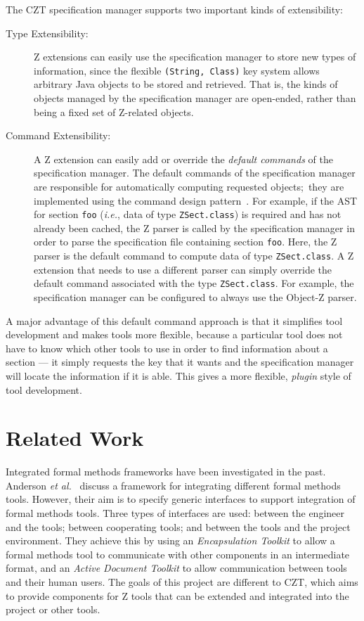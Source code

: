 \documentclass{llncs}
\newcommand{\Interface}[1]{\texttt{#1}}
\begin{document}
  The CZT specification manager supports two important kinds of
  extensibility:
  \begin{description}
  \item[Type Extensibility:] Z extensions can easily use the
    specification manager to store new types of information, since the
    flexible \texttt{(String, Class)} key system allows arbitrary Java objects
    to be stored and retrieved.  That is, the kinds of objects managed
    by the specification manager are open-ended, rather than being a
    fixed set of Z-related objects.
  \item[Command Extensibility:] A Z extension can easily add or
    override the \emph{default commands} of the specification manager.
    The default commands of the specification manager are responsible
    for automatically computing requested objects;~they are
    implemented using the command design pattern~\cite{GamEA:95}. For
    example, if the AST for section \texttt{foo} (\textit{i.e.}, data
    of type \Interface{ZSect.class}) is required and has not already been
    cached, the Z parser is called by the specification manager in
    order to parse the specification file containing section
    \texttt{foo}.  Here, the Z parser is the default command to
    compute data of type \Interface{ZSect.class}.  A Z extension that
    needs to use a different parser can simply override the default
    command associated with the type \Interface{ZSect.class}.  For
    example, the specification manager can be configured to always use
    the Object-Z parser.
    \end{description}

  A major advantage of this default command approach is that it
  simplifies tool development and makes tools more flexible, because a
  particular tool does not have to know which other tools to use in
  order to find information about a section --- it simply requests the
  key that it wants and the specification manager will locate the
  information if it is able.  This gives a more flexible,
  \emph{plugin} style of tool development.

\section{Related Work}\label{sec:related-work}

  Integrated formal methods frameworks have been investigated in the
  past. Anderson \textit{et al.}\ \cite{uitp-anderson} discuss a framework for
  integrating different formal methods tools. However, their aim is to
  specify generic interfaces to support integration of formal methods
  tools. Three types of interfaces are used: between the engineer and
  the tools; between cooperating tools; and between the tools and the
  project environment. They achieve this by using an {\em
  Encapsulation Toolkit} to allow a formal methods tool to communicate
  with other components in an intermediate format, and an {\em Active
  Document Toolkit} to allow communication between tools and their
  human users. The goals of this project are different to CZT, which
  aims to provide components for Z tools that can be extended and
  integrated into the project or other tools.
\end{document}
